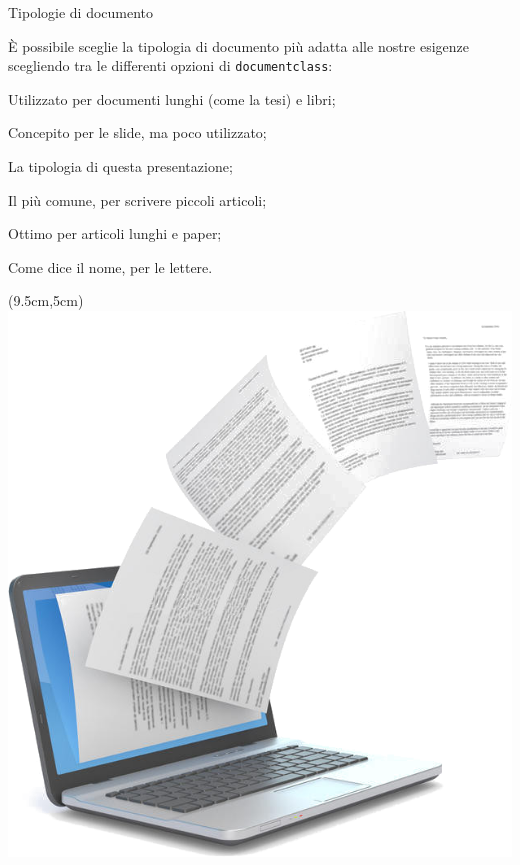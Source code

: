 \begin{frame}{Tipologie di documento}

È possibile sceglie la tipologia di documento più adatta alle nostre esigenze scegliendo 
tra le differenti opzioni di \texttt{documentclass}:

\begin{description}
	\item <2->[\textbf{book}] Utilizzato per documenti lunghi (come la tesi) e libri;
	\item <3->[\textbf{slide}] Concepito per le slide, ma poco utilizzato;
	\item <4->[\textbf{beamer}] La tipologia di questa presentazione;
	\item <5->[\textbf{article}] Il più comune, per scrivere piccoli articoli;
	\item <6->[\textbf{report}] Ottimo per articoli lunghi e paper;
	\item <7->[\textbf{letter}] Come dice il nome, per le lettere.
\end{description}

\begin{textblock*}{5cm}(9.5cm,5cm)
      \includegraphics[scale=0.50]{res/images/tipidocumento}
\end{textblock*}

\end{frame}